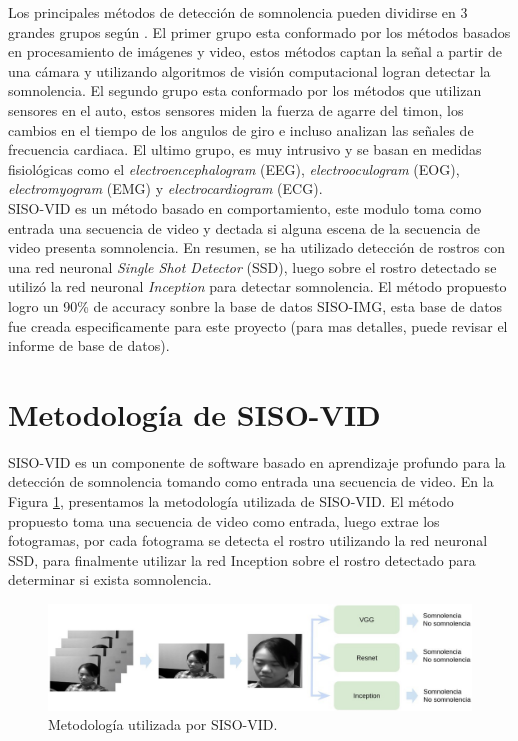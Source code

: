 \documentclass{article}
\begin{document}
	Los principales métodos de detección de somnolencia pueden dividirse en 3 grandes grupos según \cite{ramzan2019survey}. El primer grupo esta conformado por los métodos basados en procesamiento de imágenes y video, estos métodos captan la señal a partir de una cámara y utilizando algoritmos de visión computacional logran detectar la somnolencia. El segundo grupo esta conformado por los métodos que utilizan sensores en el auto, estos sensores miden la fuerza de agarre del timon, los cambios en el tiempo de los angulos de giro e incluso analizan las señales de frecuencia cardiaca. El ultimo grupo, es muy intrusivo y se basan en medidas fisiológicas como el \textit{electroencephalogram} (EEG), \textit{electrooculogram} (EOG), \textit{electromyogram} (EMG) y \textit{electrocardiogram} (ECG).\\
	
	SISO-VID es un método basado en comportamiento, este modulo toma como entrada una secuencia de video y dectada si alguna escena de la secuencia de video presenta somnolencia. En resumen, se ha utilizado detección de rostros con una red neuronal \textit{Single Shot Detector} (SSD), luego sobre el rostro detectado se utilizó la red neuronal \textit{Inception} para detectar somnolencia. El método propuesto logro un 90\% de accuracy sonbre la base de datos SISO-IMG, esta base de datos fue creada especificamente para este proyecto (para mas detalles, puede revisar el informe de base de datos). 
	
	
	
	\section{Metodología de SISO-VID} \label{desarrollo}
	
	SISO-VID es un componente de software basado en aprendizaje profundo para la detección de somnolencia tomando como entrada una secuencia de video. En la Figura \ref{fig:siso_vid}, presentamos la metodología utilizada de SISO-VID. El método propuesto toma una secuencia de video como entrada, luego extrae los fotogramas, por cada fotograma se detecta el rostro utilizando la red neuronal SSD, para finalmente utilizar la red Inception sobre el rostro detectado para determinar si exista somnolencia.\\
	
	\begin{figure}[H]
		\includegraphics[width=\textwidth]{img/siso_vid}		
		\caption{Metodología utilizada por SISO-VID.}
		\label{fig:siso_vid}
	\end{figure}
\end{document}
